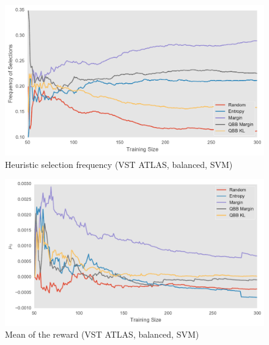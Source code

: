 \begin{figure}[p]
	\centering
	\includegraphics[width=\textwidth]{figures/5_thompson/vstatlas_ur_frequencies}
	\caption[Heuristic selection frequency (VST ATLAS, unbalanced, SVM)]{
		Heuristic selection frequency (VST ATLAS, balanced, SVM)}
	\label{fig:vstatlas_ur_frequencies}
\end{figure}

\begin{figure}[p]
	\centering
	\includegraphics[width=\textwidth]{figures/5_thompson/vstatlas_ur_mus}
	\caption[Mean of the reward (VST ATLAS, unbalanced, SVM)]{
		Mean of the reward (VST ATLAS, balanced, SVM)}
\end{figure}


